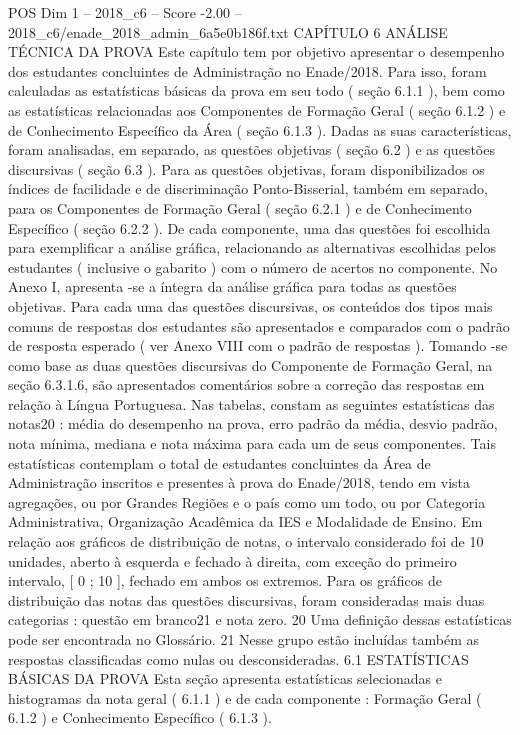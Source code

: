 \begin{textsample}{POS Dim 1 – 2018\_c6 – Score -2.00 – 2018\_c6/enade\_2018\_admin\_6a5e0b186f.txt}  \label{ex:f1_pos_246}
CAPÍTULO 6 ANÁLISE TÉCNICA DA PROVA Este capítulo tem por objetivo apresentar o desempenho dos estudantes concluintes de Administração no Enade/2018.
Para isso, foram calculadas as estatísticas básicas da prova em seu todo ( seção 6.1.1 ), bem como as estatísticas relacionadas aos Componentes de Formação Geral ( seção 6.1.2 ) e de Conhecimento Específico da Área ( seção 6.1.3 ).
Dadas as suas características, foram analisadas, em separado, as questões objetivas ( seção 6.2 ) e as questões discursivas ( seção 6.3 ).
Para as questões objetivas, foram disponibilizados os índices de facilidade e de discriminação Ponto-Bisserial, também em separado, para os Componentes de Formação Geral ( seção 6.2.1 ) e de Conhecimento Específico ( seção 6.2.2 ).
De cada componente, uma das questões foi escolhida para exemplificar a análise gráfica, relacionando as alternativas escolhidas pelos estudantes ( inclusive o gabarito ) com o número de acertos no componente.
No Anexo I, apresenta -se a íntegra da análise gráfica para todas as questões objetivas.
Para cada uma das questões discursivas, os conteúdos dos tipos mais comuns de respostas dos estudantes são apresentados e comparados com o padrão de resposta esperado ( ver Anexo VIII com o padrão de respostas ).
Tomando -se como base as duas questões discursivas do Componente de Formação Geral, na seção 6.3.1.6, são apresentados comentários sobre a correção das respostas em relação à Língua Portuguesa.
Nas tabelas, constam as seguintes estatísticas das notas20 : média do desempenho na prova, erro padrão da média, desvio padrão, nota mínima, mediana e nota máxima para cada um de seus componentes.
Tais estatísticas contemplam o total de estudantes concluintes da Área de Administração inscritos e presentes à prova do Enade/2018, tendo em vista agregações, ou por Grandes Regiões e o país como um todo, ou por Categoria Administrativa, Organização Acadêmica da IES e Modalidade de Ensino.
Em relação aos gráficos de distribuição de notas, o intervalo considerado foi de 10 unidades, aberto à esquerda e fechado à direita, com exceção do primeiro intervalo, [ 0 ; 10 ], fechado em ambos os extremos.
Para os gráficos de distribuição das notas das questões discursivas, foram consideradas mais duas categorias : questão em branco21 e nota zero. 20 Uma definição dessas estatísticas pode ser encontrada no Glossário. 21 Nesse grupo estão incluídas também as respostas classificadas como nulas ou desconsideradas. 6.1 ESTATÍSTICAS BÁSICAS DA PROVA Esta seção apresenta estatísticas selecionadas e histogramas da nota geral ( 6.1.1 ) e de cada componente : Formação Geral ( 6.1.2 ) e Conhecimento Específico ( 6.1.3 ).

\end{textsample}
